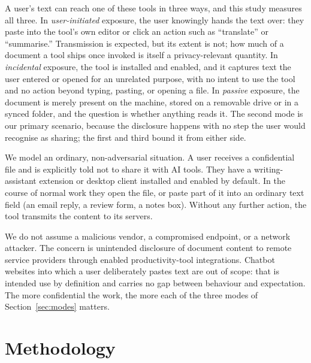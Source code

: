 \documentclass[sigconf,anonymous,review,balance=false]{acmart}
\begin{document}
\label{sec:modes}
A user's text can reach one of these tools in three ways, and this study measures all
three. In \emph{user-initiated} exposure, the user knowingly hands the text over: they
paste into the tool's own editor or click an action such as ``translate'' or
``summarise.'' Transmission is expected, but its extent is not; how much of a document a
tool ships once invoked is itself a privacy-relevant quantity. In \emph{incidental}
exposure, the tool is installed and enabled, and it captures text the user entered or
opened for an unrelated purpose, with no intent to use the tool and no action beyond typing,
pasting, or opening a file. In \emph{passive} exposure, the document is merely present on
the machine, stored on a removable drive or in a synced folder, and the question is whether
anything reads it. The second mode is our primary scenario, because the disclosure happens
with no step the user would recognise as sharing; the first and third bound it from either
side.

We model an ordinary, non-adversarial situation. A user receives a confidential file and is
explicitly told not to share it with AI tools. They have a writing-assistant extension or
desktop client installed and enabled by default. In the course of normal work they open the
file, or paste part of it into an ordinary text field (an email reply, a review form, a
notes box). Without any further action, the tool transmits the content to its servers.

We do not assume a malicious vendor, a compromised endpoint, or a network attacker. The
concern is unintended disclosure of document content to remote service providers through
enabled productivity-tool integrations. Chatbot websites into which a user deliberately
pastes text are out of scope: that is intended use by definition and carries no gap between
behaviour and expectation. The more confidential the work, the more each of the three modes
of Section~\ref{sec:modes} matters.


\section{Methodology}
\label{sec:method}
\end{document}

